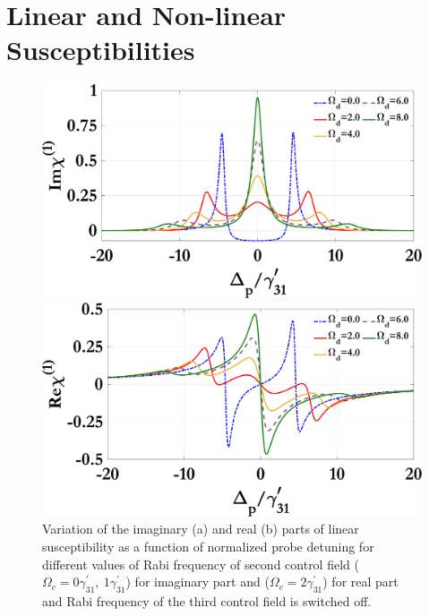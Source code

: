 \documentclass[12pt,a4paper]{article}
\begin{document}
\section{Linear and Non-linear Susceptibilities}

\noindent
\begin{figure}[h]
  \centering
  \begin{minipage}[t]{0.48\textwidth}
    \centering
    \includegraphics[width=\linewidth]{Plots/Img_chi1_Omega_d.jpeg}
    \subcaption{}
  \end{minipage}%
  \hfill
  \begin{minipage}[t]{0.48\textwidth}
    \centering
    \includegraphics[width=\linewidth]{Plots/Real_chi1_Omega_d.jpeg}
    \subcaption{}
  \end{minipage}
  \caption{Variation of the imaginary (a) and real (b) parts of linear susceptibility as a function of normalized probe detuning for different values of Rabi frequency of second control field ($\Omega_c=0\gamma^{\prime}_{31},\ 1\gamma^{\prime}_{31}$) for imaginary part and ($\Omega_c=2\gamma^{\prime}_{31}$) for real part and Rabi frequency of the third control field is switched off.}
  \label{fig:omegad}
\end{figure}
\end{document}
